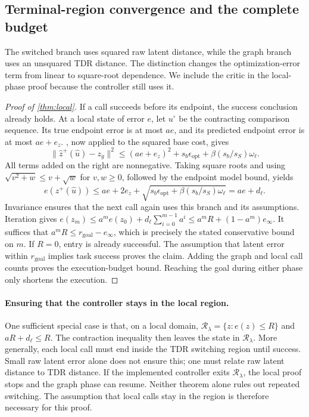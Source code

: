 \documentclass{article}
\newcommand{\Rset}{\mathcal R_\lambda}
\theoremstyle{definition}
\theoremstyle{remark}
\begin{document}
\subsection{Terminal-region convergence and the complete budget}
\label{app:local-proof}
The switched branch uses squared raw latent distance, while the graph branch uses an
unsquared TDR distance. The distinction changes the optimization-error term from
linear to square-root dependence.
We include the critic in the local-phase proof because the controller still uses it.

\begin{proof}[Proof of \cref{thm:local}]
If a call succeeds before its endpoint, the success conclusion already holds.
At a local state of error $e$, let $u^\circ$ be the contracting comparison sequence.
Its true endpoint error is at most $ae$, and its predicted endpoint error is at most
$ae+e_z$. , now applied to the squared base cost, gives
\[
 \|\hat z^+(\hat u)-z_g\|^2
 \le (ae+e_z)^2+
       s_b\epsilon_{\mathrm{opt}}+\beta(s_b/s_S)\omega_\ell.
\]
All terms added on the right are nonnegative. Taking square roots and using
$\sqrt{v^2+w}\le v+\sqrt w$ for $v,w\ge0$, followed by the endpoint model bound,
yields
\[
 e(z^+(\hat u))
 \le ae+2e_z+
       \sqrt{s_b\epsilon_{\mathrm{opt}}+\beta(s_b/s_S)\omega_\ell}
 =ae+d_\ell .
\]
Invariance ensures that the next call again uses this branch and its assumptions.
Iteration gives
$e(z_m)\le a^m e(z_0)+d_\ell\sum_{i=0}^{m-1}a^i
\le a^mR+(1-a^m)e_\infty$.
It suffices that $a^mR\le r_{\mathrm{goal}}-e_\infty$, which is precisely the
stated conservative bound on $m$. If $R=0$, entry is already successful.
The assumption that latent error within $r_{\mathrm{goal}}$ implies task success proves the claim.
Adding the graph and local call counts proves the execution-budget bound.
Reaching the goal during either phase only shortens the execution.
\end{proof}

\paragraph{Ensuring that the controller stays in the local region.}
One sufficient special case is that, on a local domain,
$\Rset=\{z:e(z)\le R\}$ and $aR+d_\ell\le R$.
The contraction inequality then leaves the state in $\Rset$.
More generally, each local call must end inside the TDR switching region until success.
Small raw latent error alone does not ensure this; one must relate raw latent distance
to TDR distance.
If the implemented controller exits $\Rset$, the local proof stops and the graph
phase can resume. Neither theorem alone rules out repeated switching.
The assumption that local calls stay in the region is therefore necessary for this proof.
\end{document}
